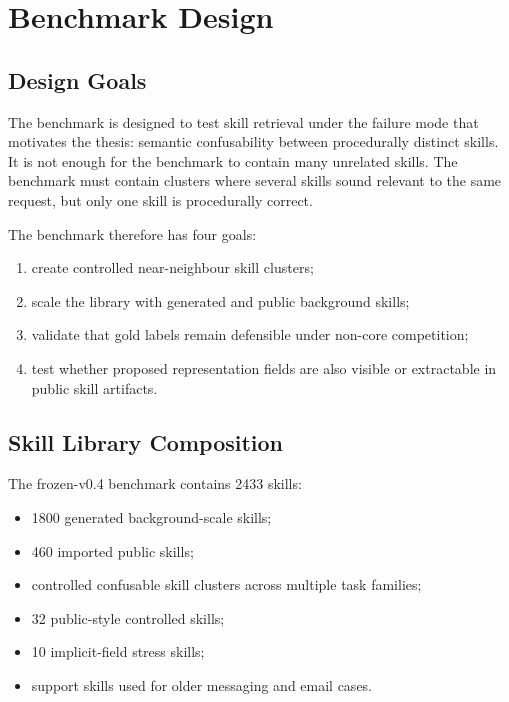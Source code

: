 \chapter{Benchmark Design}

\section{Design Goals}

The benchmark is designed to test skill retrieval under the failure mode that motivates the thesis: semantic confusability between procedurally distinct skills. It is not enough for the benchmark to contain many unrelated skills. The benchmark must contain clusters where several skills sound relevant to the same request, but only one skill is procedurally correct.

The benchmark therefore has four goals:

\begin{enumerate}
  \item create controlled near-neighbour skill clusters;
  \item scale the library with generated and public background skills;
  \item validate that gold labels remain defensible under non-core competition;
  \item test whether proposed representation fields are also visible or extractable in public skill artifacts.
\end{enumerate}

\section{Skill Library Composition}

The frozen-v0.4 benchmark contains 2433 skills:

\begin{itemize}
  \item 1800 generated background-scale skills;
  \item 460 imported public skills;
  \item controlled confusable skill clusters across multiple task families;
  \item 32 public-style controlled skills;
  \item 10 implicit-field stress skills;
  \item support skills used for older messaging and email cases.
\end{itemize}


